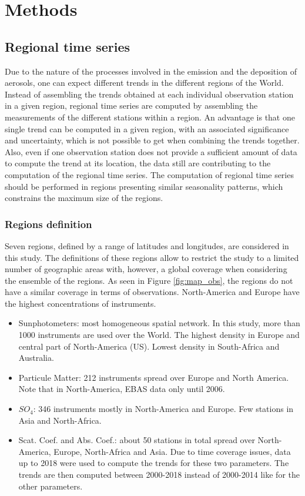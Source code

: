 \documentclass[journal abbreviation, manuscript]{copernicus}
\begin{document}
\section{Methods}

\subsection{Regional time series}
Due to the nature of the processes involved in the emission and the deposition of aerosols, one can expect different trends in the different regions of the World.
Instead of assembling the trends obtained at each individual observation station in a given region, regional time series are computed by assembling the measurements of the different stations within a region. An advantage is that one single trend can be computed in a given region, with an associated significance and uncertainty, which is not possible to get when combining the trends together. Also, even if one observation station does not provide a sufficient amount of data to compute the trend at its location, the data still are contributing to the computation of the regional time series.
The computation of regional time series should be performed in regions presenting similar seasonality patterns, which constrains the maximum size of the regions.


\subsubsection{Regions definition}
Seven regions, defined by a range of latitudes and longitudes, are considered in this study. The definitions of these regions allow to restrict the study to a limited number of geographic areas with, however, a global coverage when considering the ensemble of the regions. As seen in Figure \ref{fig:map_obs}, the regions do not have a similar coverage in terms of observations. North-America and Europe have the highest concentrations of instruments.
\begin{itemize}
 \item Sunphotometers: most homogeneous spatial network. In this study, more than 1000 instruments are used over the World. The highest density in Europe and central part of North-America (US). Lowest density in South-Africa and Australia.
 \item Particule Matter: 212 instruments spread over Europe and North America. Note that in North-America, EBAS data only until 2006.
 \item $SO_{4}$: 346 instruments mostly in North-America and Europe. Few stations in Asia and North-Africa.
 \item Scat. Coef. and Abs. Coef.: about 50 stations in total spread over North-America, Europe, North-Africa and Asia. Due to time coverage issues, data up to 2018 were used to compute the trends for these two parameters. The trends are then computed between 2000-2018 instead of 2000-2014 like for the other parameters.
\end{itemize}
\end{document}
